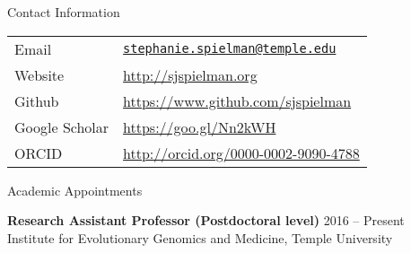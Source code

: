 \documentclass{resume} %
\begin{document}
\vspace*{0.5cm}
\begin{rSection}{Contact Information}
\vspace*{0.25cm}

\begin{table}[H]
	\begin{tabular}{ll}
		Email & \texttt{\href{mailto:stephanie.spielman@temple.edu}{stephanie.spielman@temple.edu}} \\
		Website & \url{http://sjspielman.org} \\
		Github &  \url{https://www.github.com/sjspielman} \\
		Google Scholar & \url{https://goo.gl/Nn2kWH} \\
		ORCID & \url{http://orcid.org/0000-0002-9090-4788} \\
	\end{tabular}
\end{table}
\end{rSection}
\vspace*{-0.45cm}



\begin{rSection}{Academic Appointments}
\vspace*{0.25cm}

{\bf Research Assistant Professor (Postdoctoral level)} \hfill {2016 -- Present} \\
Institute for Evolutionary Genomics and Medicine, Temple University \\
\end{rSection}

\end{document}
